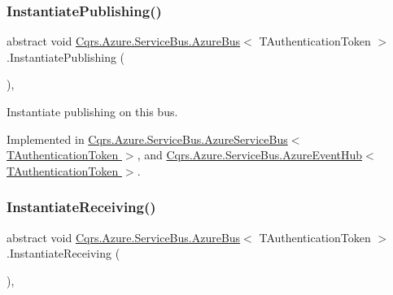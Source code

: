 \subsubsection{\texorpdfstring{Instantiate\+Publishing()}{InstantiatePublishing()}}
{\footnotesize\ttfamily abstract void \hyperlink{classCqrs_1_1Azure_1_1ServiceBus_1_1AzureBus}{Cqrs.\+Azure.\+Service\+Bus.\+Azure\+Bus}$<$ T\+Authentication\+Token $>$.Instantiate\+Publishing (\begin{DoxyParamCaption}{ }\end{DoxyParamCaption})\hspace{0.3cm}{\ttfamily [protected]}, {}}



Instantiate publishing on this bus. 



Implemented in \hyperlink{classCqrs_1_1Azure_1_1ServiceBus_1_1AzureServiceBus_a5c286d29b0bbfe3770f3407efda57036_a5c286d29b0bbfe3770f3407efda57036}{Cqrs.\+Azure.\+Service\+Bus.\+Azure\+Service\+Bus$<$ T\+Authentication\+Token $>$}, and \hyperlink{classCqrs_1_1Azure_1_1ServiceBus_1_1AzureEventHub_a3747fb9fcb3de2a72c8a6d7bbd92db95_a3747fb9fcb3de2a72c8a6d7bbd92db95}{Cqrs.\+Azure.\+Service\+Bus.\+Azure\+Event\+Hub$<$ T\+Authentication\+Token $>$}.

\mbox{\label{classCqrs_1_1Azure_1_1ServiceBus_1_1AzureBus_ac9f66dd531dcde49be72ba8f2cb28e9b_ac9f66dd531dcde49be72ba8f2cb28e9b}} 
\subsubsection{\texorpdfstring{Instantiate\+Receiving()}{InstantiateReceiving()}}
{\footnotesize\ttfamily abstract void \hyperlink{classCqrs_1_1Azure_1_1ServiceBus_1_1AzureBus}{Cqrs.\+Azure.\+Service\+Bus.\+Azure\+Bus}$<$ T\+Authentication\+Token $>$.Instantiate\+Receiving (\begin{DoxyParamCaption}{ }\end{DoxyParamCaption})\hspace{0.3cm}{\ttfamily [protected]}, {}}



